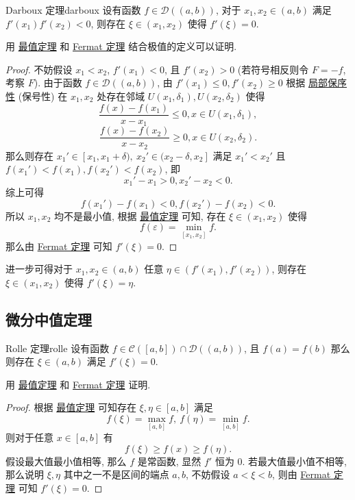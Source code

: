 \documentclass[cn,toc=twocol]{elegantbook}
\newcommand{\D}{\mathscr{D}}
\begin{document}
\begin{theorem}{Darboux 定理}{darboux}
	设有函数 $f \in \D((a,b))$, 对于 $x_1,x_2\in(a,b)$ 满足 $f'(x_1)f'(x_2) < 0$, 则存在 $\xi\in(x_1,x_2)$ 使得 $f'(\xi) = 0$.
\end{theorem}
\begin{idea*}
	用 \hyperref[thm:C_p2]{最值定理} 和 \hyperref[thm:fermat]{Fermat 定理} 结合极值的定义可以证明.
\end{idea*}
\begin{proof}
	不妨假设 $x_1 < x_2$, $f′(x_1) < 0$, 且 $f′(x_2) >0$ (若符号相反则令 $F = -f$, 考察 $F$). 由于函数 $f \in \D((a,b))$, 由 $f'(x_1) \le 0, f'(x_2) \ge 0$ 根据 \hyperref[Flimit_p3]{局部保序性} (保号性) 在 $x_1, x_2$ 处存在邻域 $U(x_1,\delta_1), U(x_2,\delta_2)$ 使得
	\[
		\frac{f(x) - f(x_1)}{x - x_1} \le 0, x \in U(x_1,\delta_1),
	\]
	\[
		\frac{f(x) - f(x_2)}{x - x_2} \ge 0, x \in U(x_2,\delta_2).
	\]
	那么则存在 $x_1' \in [x_1, x_1 + \delta), \ x_2' \in (x_2 - \delta, x_2]$ 满足 $x_1' < x_2'$ 且 $f(x_1') < f(x_1), f(x_2') < f(x_2)$, 即
	\[
		x_1' - x_1 > 0, x_2' - x_2 < 0.  
	\]
	综上可得
	\[
		f(x_1') - f(x_1) < 0, f(x_2') - f(x_2) < 0.
	\]
	所以 $x_1, x_2$ 均不是最小值, 根据 \hyperref[thm:C_p2]{最值定理} 可知, 存在 $\xi \in (x_1, x_2)$ 使得 
	\[
		f(\varepsilon) = \min_{[x_1,x_2]}f.
	\]
	那么由 \hyperref[thm:fermat]{Fermat 定理} 可知 $f'(\xi) = 0$.
\end{proof}
\vspace{0.5em}

进一步可得对于 $x_1,x_2\in(a,b)$ 任意 $\eta \in (f'(x_1),f'(x_2))  $, 则存在 $\xi\in(x_1,x_2)$ 使得 $f'(\xi) = \eta$.

\subsection{微分中值定理}

\begin{theorem}{Rolle 定理}{rolle}
	设有函数 $f \in \mathscr{C}([a,b]) \cap \D((a,b))$, 且 $f(a) = f(b)$ 那么则存在 $\xi \in (a,b)$ 满足 $f'(\xi) = 0$.
\end{theorem}
\begin{idea*}
	用 \hyperref[thm:C_p2]{最值定理} 和 \hyperref[thm:fermat]{Fermat 定理} 证明.
\end{idea*}
\begin{proof}
	根据 \hyperref[thm:C_p2]{最值定理} 可知存在 $\xi,\eta \in [a,b]$ 满足
	\[
		f(\xi) = \max_{[a,b]} f ,\ f(\eta) = \min_{[a,b]} f.
	\]
	则对于任意 $x \in [a,b]$ 有
	\[
		f(\xi) \ge f(x) \ge f(\eta).
	\]
	假设最大值最小值相等, 那么 $f$ 是常函数, 显然 $f'$ 恒为 $0$. 若最大值最小值不相等, 那么说明 $\xi, \eta$ 其中之一不是区间的端点 $a,b$, 不妨假设 $a < \xi < b$, 则由 \hyperref[thm:fermat]{Fermat 定理} 可知 $f'(\xi) = 0$.
\end{proof}
\end{document}
